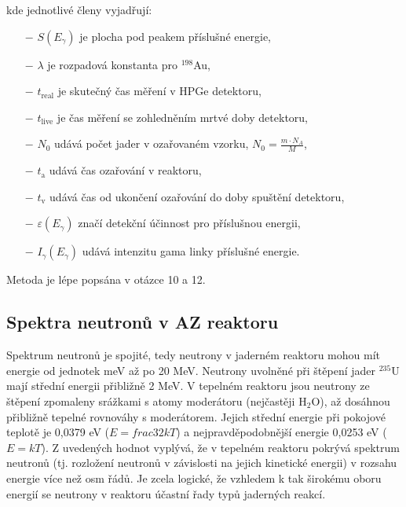 kde jednotlivé členy vyjadřují:

\begin{itemize}%
    \item [$-$] $S(E_{\gamma})$ je plocha pod peakem příslušné energie,
    \item [$-$] $\lambda$ je rozpadová konstanta pro $^{198}$Au,
    \item [$-$] $t_\text{real}$ je skutečný čas měření v HPGe detektoru, 
    \item [$-$] $t_\text{live}$ je čas měření se zohledněním mrtvé doby detektoru,
    \item [$-$] $N_0$ udává počet jader v ozařovaném vzorku, $N_0 = \frac{m \cdot N_A}{M}$,
    \item [$-$] $t_\text{a}$ udává čas ozařování v reaktoru,
    \item [$-$] $t_\text{v}$ udává čas od ukončení ozařování do doby spuštění detektoru,
    \item [$-$] $\varepsilon(E_{\gamma})$ značí detekční účinnost pro příslušnou energii,
    \item [$-$] $I_{\gamma}(E_{\gamma})$ udává intenzitu gama linky příslušné energie.
\end{itemize}

Metoda je lépe popsána v otázce 10 a 12.

\subsection{Spektra neutronů v AZ reaktoru}

Spektrum neutronů je spojité, tedy neutrony v jaderném reaktoru mohou mít energie od jednotek meV až po 20 MeV. Neutrony uvolněné při štěpení jader $^{235}$U mají střední energii přibližně 2 MeV. V tepelném reaktoru jsou neutrony ze štěpení zpomaleny srážkami s atomy moderátoru (nejčastěji H$_2$O), až dosáhnou přibližně tepelné rovnováhy s moderátorem. Jejich střední energie při pokojové teplotě je 0,0379 eV ($E = frac{3}{2} kT$) a nejpravděpodobnější energie 0,0253 eV ($E=kT$). Z uvedených hodnot vyplývá, že v tepelném reaktoru pokrývá spektrum neutronů (tj. rozložení neutronů v závislosti na jejich kinetické energii) v rozsahu energie více než osm řádů. Je zcela logické, že vzhledem k tak širokému oboru energií se neutrony v reaktoru účastní řady typů jaderných reakcí.

